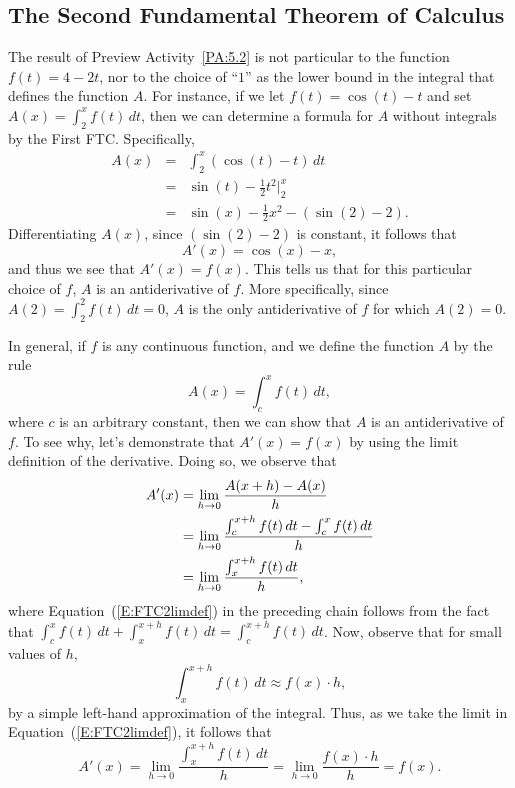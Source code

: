 \subsection*{The Second Fundamental Theorem of Calculus}

The result of Preview Activity~\ref{PA:5.2} is not particular to the function $f(t) = 4-2t$, nor to the choice of ``$1$'' as the lower bound in the integral that defines the function $A$.  For instance, if we let $f(t) = \cos(t) - t$ and set $A(x) = \int_2^x f(t) \, dt$, then we can determine a formula for $A$ without integrals by the First FTC.  Specifically,
\begin{eqnarray*}
A(x) & = & \int_2^x (\cos(t) - t) \, dt \\
	& = & \sin(t) - \frac{1}{2}t^2 \bigg\vert_2^x \\
	& = & \sin(x) -  \frac{1}{2}x^2 - \left(\sin(2) - 2 \right).
\end{eqnarray*}
Differentiating $A(x)$, since $(\sin(2) - 2)$ is constant, it follows that 
$$A'(x) = \cos(x) - x,$$
and thus we see that $A'(x) = f(x)$.  This tells us that for this particular choice of $f$, $A$ is an antiderivative of $f$.  More specifically, since $A(2) = \int_2^2 f(t) \, dt = 0$, $A$ is the only antiderivative of $f$ for which $A(2) = 0$.

In general, if $f$ is any continuous function, and we define the function $A$ by the rule 
$$A(x) = \int_c^x f(t) \, dt,$$
where $c$ is an arbitrary constant, then we can show that $A$ is an antiderivative of $f$.  To see why, let's demonstrate that $A'(x) = f(x)$ by using the limit definition of the derivative.  Doing so, we observe that
\begin{align}
A'(x) &= \lim_{h \to 0} \frac{A(x+h) - A(x)}{h} \notag \\
	&= \lim_{h \to 0} \frac{\int_c^{x+h} f(t) \, dt - \int_c^x f(t) \, dt}{h} \notag \\
	&= \lim_{h \to 0} \frac{\int_x^{x+h} f(t) \, dt}{h}, \label{E:FTC2limdef}
\end{align}
where Equation~(\ref{E:FTC2limdef}) in the preceding chain follows from the fact that $\int_c^x f(t) \,dt + \int_x^{x+h} f(t) \, dt = \int_c^{x+h} f(t) \, dt$.  Now, observe that for small values of $h$,
$$\int_x^{x+h} f(t) \, dt \approx f(x) \cdot h,$$
by a simple left-hand approximation of the integral.  Thus, as we take the limit in Equation~(\ref{E:FTC2limdef}), it follows that
$$A'(x) =  \lim_{h \to 0} \frac{\int_x^{x+h} f(t) \, dt}{h} = \lim_{h \to 0} \frac{f(x) \cdot h}{h} = f(x).$$

